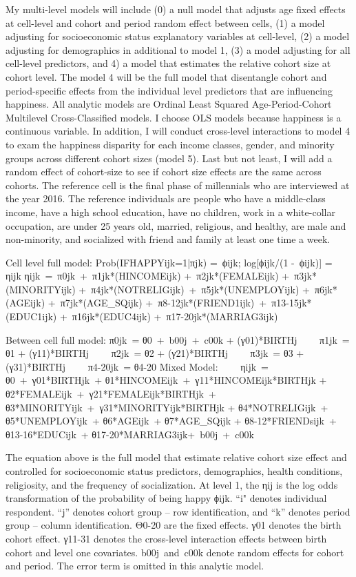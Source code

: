 My multi-level models will include (0) a null model that adjusts age fixed effects at cell-level and cohort and period random effect between cells, (1) a model adjusting for socioeconomic status explanatory variables at cell-level, (2) a model adjusting for demographics in additional to model 1, (3) a model adjusting for all cell-level predictors, and 4) a model that estimates the relative cohort size at cohort level. The model 4 will be the full model that disentangle cohort and period-specific effects from the individual level predictors that are influencing happiness. All analytic models are Ordinal Least Squared Age-Period-Cohort Multilevel Cross-Classified models. I choose OLS models because happiness is a continuous variable. In addition, I will conduct cross-level interactions to model 4 to exam the happiness disparity for each income classes, gender, and minority groups across different cohort sizes (model 5). Last but not least, I will add a random effect of cohort-size to see if cohort size effects are the same across cohorts. The reference cell is the final phase of millennials who are interviewed at the year 2016. The reference individuals are people who have a middle-class income, have a high school education, have no children, work in a white-collar occupation, are under 25 years old, married, religious, and healthy, are male and non-minority, and socialized with friend and family at least one time a week.

Cell level full model:
Prob(IFHAPPYijk=1|πjk) = ϕijk; log[ϕijk/(1 - ϕijk)] = ηijk ηijk = π0jk + π1jk*(HINCOMEijk) + π2jk*(FEMALEijk) + π3jk*(MINORITYijk) + π4jk*(NOTRELIGijk) + π5jk*(UNEMPLOYijk) + π6jk*(AGEijk) + π7jk*(AGE_SQijk) + π8-12jk*(FRIEND1ijk) + π13-15jk*(EDUC1ijk) + π16jk*(EDUC4ijk) + π17-20jk*(MARRIAG3ijk)

Between cell full model:
π0jk = θ0 + b00j + c00k + (γ01)*BIRTHj     π1jk = θ1 + (γ11)*BIRTHj     π2jk = θ2 + (γ21)*BIRTHj     π3jk = θ3 + (γ31)*BIRTHj     π4-20jk = θ4-20
Mixed Model:    
ηijk = θ0 + γ01*BIRTHjk + θ1*HINCOMEijk + γ11*HINCOMEijk*BIRTHjk + θ2*FEMALEijk + γ21*FEMALEijk*BIRTHjk + θ3*MINORITYijk + γ31*MINORITYijk*BIRTHjk + θ4*NOTRELIGijk + θ5*UNEMPLOYijk + θ6*AGEijk + θ7*AGE_SQijk + θ8-12*FRIENDsijk + θ13-16*EDUCijk + θ17-20*MARRIAG3ijk+ b00j + c00k

The equation above is the full model that estimate relative cohort size effect and controlled for socioeconomic status predictors, demographics, health conditions, religiosity, and the frequency of socialization. At level 1, the ηij is the log odds transformation of the probability of being happy ϕijk. “i" denotes individual respondent. “j” denotes cohort group – row identification, and “k” denotes period group – column identification. Θ0-20 are the fixed effects. γ01 denotes the birth cohort effect. γ11-31 denotes the cross-level interaction effects between birth cohort and level one covariates. b00j and c00k denote random effects for cohort and period. The error term is omitted in this analytic model.

